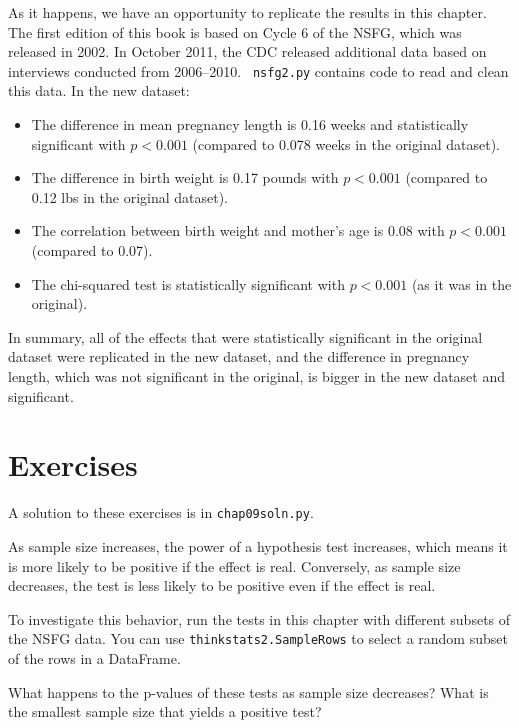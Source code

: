 As it happens, we have an opportunity to replicate the results in this
chapter.  The first edition of this book is based on Cycle 6 of the
NSFG, which was released in 2002.  In October 2011, the CDC released
additional data based on interviews conducted from 2006--2010.  {\tt
  nsfg2.py} contains code to read and clean this data.  In the new
dataset:

\begin{itemize}

\item The difference in mean pregnancy length is
0.16 weeks and statistically significant with $p < 0.001$ (compared
to 0.078 weeks in the original dataset).
 

\item The difference in birth weight is 0.17 pounds with $p < 0.001$
(compared to 0.12 lbs in the original dataset).

\item The correlation between birth weight and mother's age is
0.08 with $p < 0.001$ (compared to 0.07).

\item The chi-squared test is statistically significant with
$p < 0.001$ (as it was in the original).

\end{itemize}

In summary, all of the effects that were statistically significant
in the original dataset were replicated in the new dataset, and the
difference in pregnancy length, which was not significant in the
original, is bigger in the new dataset and significant.


\section{Exercises}

A solution to these exercises is in \verb"chap09soln.py".

\begin{exercise}
As sample size increases, the power of a hypothesis test increases,
which means it is more likely to be positive if the effect is real.
Conversely, as sample size decreases, the test is less likely to
be positive even if the effect is real.

To investigate this behavior, run the tests in this chapter with
different subsets of the NSFG data.  You can use {\tt thinkstats2.SampleRows}
to select a random subset of the rows in a DataFrame.

What happens to the p-values of these tests as sample size decreases?
What is the smallest sample size that yields a positive test?
\end{exercise}



